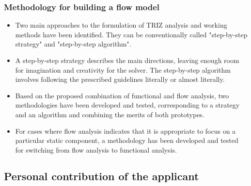 \documentclass[a4paper,11pt]{article}
\begin{document}
\subsubsection{Methodology for building a flow model}
\begin{itemize}
\item Two main approaches to the formulation of TRIZ analysis and working
  methods have been identified. They can be conventionally called
  "step-by-step strategy" and "step-by-step algorithm".
\item A step-by-step strategy describes the main directions, leaving enough
  room for imagination and creativity for the solver. The step-by-step
  algorithm involves following the prescribed guidelines literally or almost
  literally.
\item Based on the proposed combination of functional and flow analysis, two
  methodologies have been developed and tested, corresponding to a strategy
  and an algorithm and combining the merits of both prototypes.
\item For cases where flow analysis indicates that it is appropriate to focus
  on a particular static component, a methodology has been developed and
  tested for switching from flow analysis to functional analysis.
\end{itemize}

\subsection{Personal contribution of the applicant}
\end{document}
